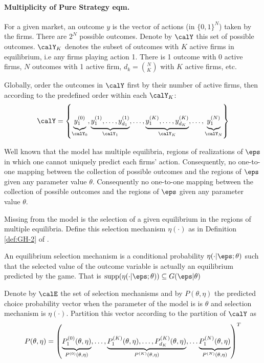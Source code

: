 \paragraph{Multiplicity of Pure Strategy eqm.}

For a given market, an outcome $y$ is the vector of actions (in $\{0,1\}^N$) taken by the firms. There are $2^N$ possible outcomes. Denote by $\calY$ this set of possible outcomes. $\calY_K$ denotes the subset of outcomes with $K$ active firms in equilibrium, i.e any firms playing action 1. There is 1 outcome with 0 active firms, $N$ outcomes  with 1 active firm, $d_k = \binom{N}{K}$ with $K$ active firms, etc. 

Globally, order the outcomes in $\calY$ first by their number of active firms, then according to the predefined order within each $\calY_K$:
\[\calY = \left\{\underbrace{y_1^{(0)}\vphantom{,\dots,y_{d_K}^{(N)}}}_{\calY_0}, \underbrace{y_1^{(1)}, \dots, y_{d_1}^{(1)}}_{\calY_1}, \dots, \underbrace{y_1^{(K)},\dots,y_{d_K}^{(K)}}_{\calY_K},\dots, \underbrace{\vphantom{,\dots,y_{d_K}^{(N)}}y_1^{(N)}}_{\calY_N} \right\}\]

Well known that the model has multiple equilibria, regions of realizations of $\eps$ in which one cannot uniquely predict each firms' action. Consequently, no one-to-one mapping between the collection of possible outcomes and the regions of $\eps$ given any parameter value $\theta$. Consequently no one-to-one mapping between the collection of possible outcomes and the regions of $\eps$ given any parameter value $\theta$. 

Missing from the model is the selection of a given equilibrium in the regions of multiple equilibria. Define this selection mechanism $\eta(\cdot)$ as in Definition \ref{def:GH-2} of \citet{GH-2011}.

\begin{definition}
	\label{def:BK-1}
	An equilibrium selection mechanism is a conditional probability $\eta(\cdot | \eps; \theta)$ such that the selected value of the outcome variable is actually an equilibrium predicted by the game. That is $\supp(\eta(\cdot | \eps;\theta)) \subseteq G(\eps |\theta) $
\end{definition}

Denote by $\calE$ the set of selection mechanisms and by \(P(\theta,\eta)\) the predicted choice probability vector when the parameter of the model is is \(\theta\) and selection mechanism is $\eta(\cdot)$. Partition this vector according to the partition of $\calY$ as 
\begin{equation}
	\label{eq:BK-2}
	P(\theta,\eta) = \left(\underbrace{\vphantom{,\dots P_{d_k}^{(K)}(\theta,\eta)}P_1^{(0)}(\theta,\eta)}_{P^{(0)}(\theta,\eta)},\dots, \underbrace{P_1^{(K)}(\theta,\eta),\dots, P_{d_K}^{(K)}(\theta,\eta)}_{P^{(K)}(\theta,\eta)},\dots\underbrace{\vphantom{,\dots P_{d_k}^{(K)}}P_1^{(N)}(\theta,\eta)}_{P^{(N)}(\theta,\eta)}\right)^T
\end{equation}

